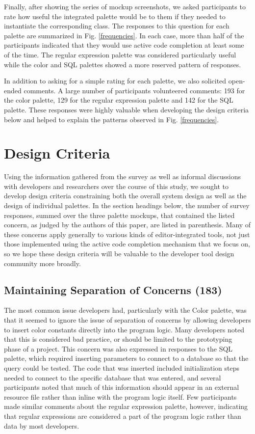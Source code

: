 \documentclass[10pt, conference, compsocconf]{IEEEtran}
\begin{document}
Finally, after showing the series of mockup screenshots, we asked participants to rate how useful the integrated palette would be to them if they needed to instantiate the corresponding class. The responses to this question for each palette are summarized in Fig. \ref{frequencies}. In each case, more than half of the participants indicated that they would use active code completion at least some of the time. The regular expression palette was considered particularly useful while the color and SQL palettes showed a more reserved pattern of responses. 

In addition to asking for a simple rating for each palette, we also solicited open-ended comments. A large number of participants volunteered comments: 193 for the color palette, 129 for the regular expression palette and 142 for the SQL palette. These responses were highly valuable when developing the design criteria below and helped to explain the patterns observed in Fig. \ref{frequencies}.

\section{Design Criteria}
Using the information gathered from the survey as well as informal discussions with developers and researchers over the course of this study, we sought to develop design criteria constraining both the overall system design as well as the design of individual palettes. In the section headings below, the number of survey responses, summed over the three palette mockups, that contained the listed concern, as judged by the authors of this paper, are listed in parenthesis. Many of these concerns apply generally to various kinds of editor-integrated tools, not just those implemented using the active code completion mechanism that we focus on, so we hope these design criteria will be valuable to the developer tool design community more broadly.

\subsection{Maintaining Separation of Concerns (183)}
The most common issue developers had, particularly with the Color palette, was that it seemed to ignore the issue of separation of concerns by allowing developers to insert color constants directly into the program logic. Many developers noted that this is considered bad practice, or should be limited to the prototyping phase of a project. This concern was also expressed in responses to the SQL palette, which required inserting parameters to connect to a database so that the query could be tested. The code that was inserted included initialization steps needed to connect to the specific database that was entered, and several participants noted that much of this information should appear in an external resource file rather than inline with the program logic itself. Few participants made similar comments about the regular expression palette, however, indicating that regular expressions are considered a part of the program logic rather than data by most developers.
\end{document}
